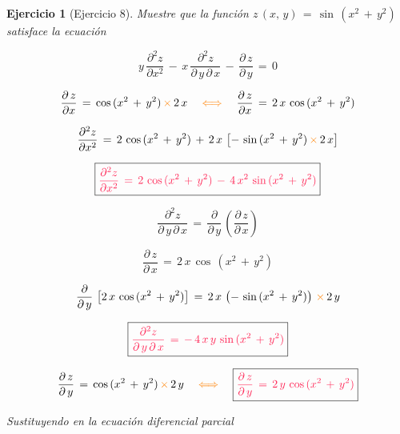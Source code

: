 \documentclass[a4paper,11pt]{book}
\newtheorem{ejer}{Ejercicio}[section]
\begin{document}
\begin{ejer}[Ejercicio 8] 

  Muestre que la función $z\,(x,\,y)\,=\,\sin\,(x^{2}\,+\,y^{2})$ satisface la ecuación 

  

$$y\,\dfrac{\partial^2{z}}{\partial{x}^{2}}\,-\,x\,\dfrac{\partial^2{z}}{\partial\,y\,\partial\,x}\,-\,\dfrac{\partial\,z}{\partial\,y}\,=\,0$$ 

  

$$\dfrac{\partial\,z}{\partial{x}}\,=\,\cos\,(x^{2}\,+\,y^{2})\,\textcolor{orange}{\times}\,2\,x \quad \textcolor{orange}{\iff} \quad \dfrac{\partial\,z}{\partial{x}}\,=\,2\,x\,\cos\,(x^{2}\,+\,y^{2})$$ 

  

$$\dfrac{\partial^2{z}}{\partial{x}^{2}}\,=\,2\,\cos\,(x^{2}\,+\,y^{2})\,+\,2\,x\,\left[-\,\sin\,(x^{2}\,+\,y^{2})\,\textcolor{orange}{\times}\,2\,x \right]$$ 

  


  

$$\boxed{\textcolor{awesome}{\dfrac{\partial^2{z}}{\partial{x}^{2}}\,=\,2\,\cos\,(x^{2}\,+\,y^{2})\,-\,4\,x^{2}\,\sin\,(x^{2}\,+\,y^{2})}}$$ 

  

$$\dfrac{\partial^2{z}}{\partial\,y\,\partial\,x}\,=\,\dfrac{\partial}{\partial\,y}\,\left(\dfrac{\partial\,z}{\partial\,x} \right)$$ 

  

$$\dfrac{\partial\,z}{\partial\,x}\,=\,2\,x\,\cos\,(x^{2}\,+\,y^{2})$$ 

  

$$\dfrac{\partial}{\partial\,y}\,\left[2\,x\,\cos\,(x^{2}\,+\,y^{2}) \right]\,=\,2\,x\,\left(-\,\sin\,(x^{2}\,+\,y^{2}) \right)\,\textcolor{orange}{\times}\,2\,y$$ 

  

$$\boxed{\textcolor{awesome}{\dfrac{\partial^2{z}}{\partial\,y\,\partial\,x}\,=\,-\,4\,x\,y\,\sin\,(x^{2}\,+\,y^{2}) } } $$ 

  

$$\dfrac{\partial\,z}{\partial\,y}\,=\,\cos\,(x^{2}\,+\,y^{2})\,\textcolor{orange}{\times}\,2\,y \quad \textcolor{orange}{\iff} \quad \boxed{\textcolor{awesome}{\dfrac{\partial\,z}{\partial\,y}\,=\,2\,y\,\cos\,(x^{2}\,+\,y^{2}) } }$$ 

  

Sustituyendo en la ecuación diferencial parcial  


\end{ejer}
\end{document}
